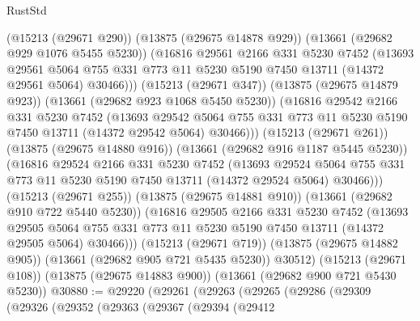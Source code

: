 \begin{lexlean}{RustStd}
\begin{coremodule}
              (@15213 (@29671 @290))
              (@13875 (@29675 @14878 @929))
              (@13661 (@29682 @929 @1076 @5455 @5230))
              (@16816
                @29561
                @2166
                @331
                @5230
                @7452
                (@13693
                  @29561
                  @5064
                  @755
                  @331
                  @773
                  @11
                  @5230
                  @5190
                  @7450
                  @13711
                  (@14372 @29561 @5064)
                  @30466)))
            (@15213 (@29671 @347))
            (@13875 (@29675 @14879 @923))
            (@13661 (@29682 @923 @1068 @5450 @5230))
            (@16816
              @29542
              @2166
              @331
              @5230
              @7452
              (@13693
                @29542
                @5064
                @755
                @331
                @773
                @11
                @5230
                @5190
                @7450
                @13711
                (@14372 @29542 @5064)
                @30466)))
          (@15213 (@29671 @261))
          (@13875 (@29675 @14880 @916))
          (@13661 (@29682 @916 @1187 @5445 @5230))
          (@16816
            @29524
            @2166
            @331
            @5230
            @7452
            (@13693
              @29524
              @5064
              @755
              @331
              @773
              @11
              @5230
              @5190
              @7450
              @13711
              (@14372 @29524 @5064)
              @30466)))
        (@15213 (@29671 @255))
        (@13875 (@29675 @14881 @910))
        (@13661 (@29682 @910 @722 @5440 @5230))
        (@16816
          @29505
          @2166
          @331
          @5230
          @7452
          (@13693
            @29505
            @5064
            @755
            @331
            @773
            @11
            @5230
            @5190
            @7450
            @13711
            (@14372 @29505 @5064)
            @30466)))
      (@15213 (@29671 @719))
      (@13875 (@29675 @14882 @905))
      (@13661 (@29682 @905 @721 @5435 @5230))
      @30512)
    (@15213 (@29671 @108))
    (@13875 (@29675 @14883 @900))
    (@13661 (@29682 @900 @721 @5430 @5230))
@30880 := @29220
    (@29261
      (@29263
        (@29265
          (@29286
            (@29309
              (@29326
                (@29352
                  (@29363
                    (@29367
                      (@29394
                        (@29412

\end{coremodule}
\end{lexlean}
